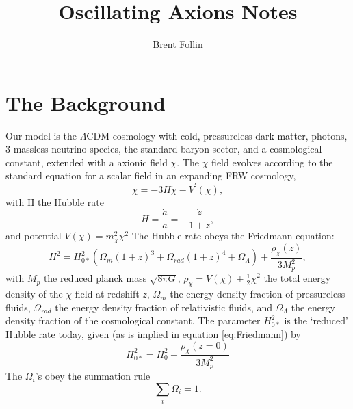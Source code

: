 \documentclass{emulateapj}
\begin{document}
\title{Oscillating Axions Notes}
\author{Brent Follin}
\maketitle


\section{The Background}
Our model is the $\Lambda$CDM cosmology with cold, pressureless dark matter, photons, 3 massless neutrino species, the standard baryon sector, and a cosmological constant, extended with a axionic field $\chi$.  The $\chi$ field evolves according to the standard equation for a scalar field in an expanding FRW cosmology,
\begin{equation}
\label{eq:scalarfield}
\ddot{\chi} = - 3 H \dot{\chi} - V^\prime\left(\chi\right),
\end{equation}
with H the Hubble rate
\begin{equation}
\label{eq:hubblerate}
H = \frac{\dot{a}}{a} = - \frac{\dot z}{1+z},
\end{equation} 
and potential $V\left(\chi\right) = m_{\chi}^2 \chi^2$ 
The Hubble rate obeys the Friedmann equation:
\begin{equation}
\label{eq:Friedmann}
H^2 = H^2_{0*} (\Omega_m (1+z)^3 + \Omega_{rad} (1+z)^4 + \Omega_\Lambda) + \frac{\rho_\chi\left(z\right)}{3M_p^2},
\end{equation}
with $M_p$ the reduced planck mass $\sqrt{8\pi G}$,  $\rho_\chi = V\left(\chi\right) + \frac{1}{2} \dot{\chi}^2$ the total energy density of the $\chi$ field at redshift $z$, $\Omega_m$ the energy density fraction of pressureless fluids, $\Omega_{rad}$ the energy density fraction of relativistic fluids, and $\Omega_\Lambda$ the energy density fraction of the cosmological constant.  The parameter $H^2_{0*}$ is the `reduced' Hubble rate today, given (as is implied in equation \ref{eq:Friedmann}) by 
\begin{equation}
H^2_{0*} = H^2_0 - \frac{\rho_\chi\left(z = 0\right)}{3M_p^2}
\end{equation}
The $\Omega_i$'s obey the summation rule 
\begin{equation}
\sum_i \Omega_i = 1.
\end{equation}
\end{document}
